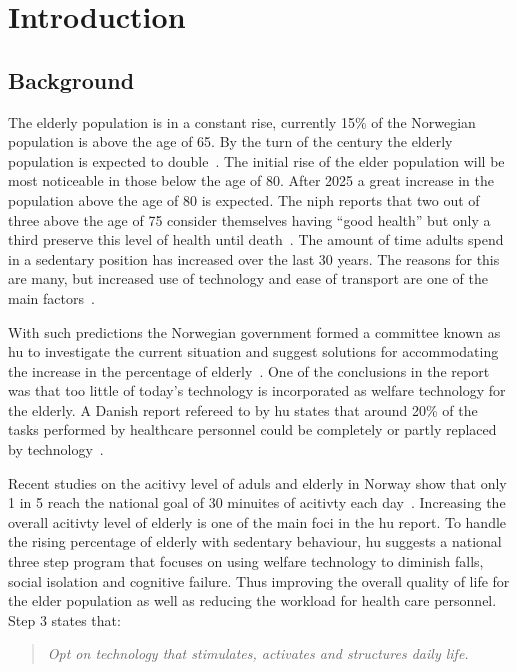 \chapter{Introduction}

\section{Background}
The elderly population is in a constant rise, currently 15\% of the Norwegian population is above the age of 65. By the turn of the century the elderly population is expected to double~\cite{elder}. The initial rise of the elder population will be most noticeable in those below the age of 80. After 2025 a great increase in the population above the age of 80 is expected. The \gls{niph} reports that two out of three above the age of 75 consider themselves having ``good health'' but only a third preserve this level of health until death~\cite{elder}. The amount of time adults spend in a sedentary position has increased over the last 30 years. The reasons for this are many, but increased use of technology and ease of transport are one of the main factors~\cite{sedentaryBehaviour}.

With such predictions the Norwegian government formed a committee known as \gls{hu} to investigate the current situation and suggest solutions for accommodating the increase in the percentage of elderly~\cite{haagen}. One of the conclusions in the report was that too little of today's technology is incorporated as welfare technology for the elderly. A Danish report refereed to by \gls{hu} states that around 20\% of the tasks performed by healthcare personnel could be completely or partly replaced by technology~\cite{kmd}. 

Recent studies on the acitivy level of aduls and elderly in Norway show that only 1 in 5 reach the national goal of 30 minuites of acitivty each day~\cite{fysiskAktivitet2009}. Increasing the overall acitivty level of elderly is one of the main foci in the \gls{hu} report. To handle the rising percentage of elderly with sedentary behaviour, \gls{hu} suggests a national three step program that focuses on using welfare technology to diminish falls, social isolation and cognitive failure. Thus improving the overall quality of life for the elder population as well as reducing the workload for health care personnel. Step 3 states that:
\begin{quote}
\textit{Opt on technology that stimulates, activates and structures daily life.}
\end{quote}

